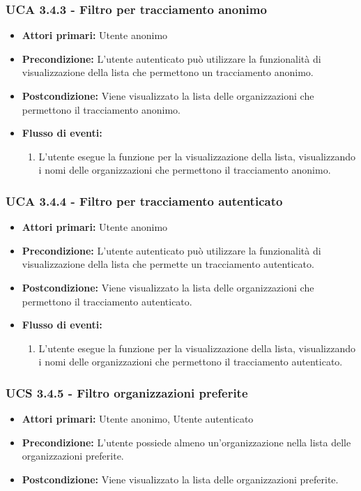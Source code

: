 \subsubsection{UCA 3.4.3 - Filtro per tracciamento anonimo}%
\begin{itemize}
	\item \textbf{Attori primari:} Utente anonimo
	\item \textbf{Precondizione:} L'utente autenticato può utilizzare la funzionalità di visualizzazione della lista che permettono un tracciamento anonimo.
	\item \textbf{Postcondizione:} Viene visualizzato la lista delle organizzazioni che permettono il tracciamento anonimo.
	\item \textbf{Flusso di eventi:}
		\begin{enumerate}
		\item L'utente esegue la funzione per la visualizzazione della lista, visualizzando i nomi delle organizzazioni che permettono il tracciamento anonimo.
	\end{enumerate}
\end{itemize}

\subsubsection{UCA 3.4.4 - Filtro per tracciamento autenticato}%
\begin{itemize}
	\item \textbf{Attori primari:} Utente anonimo
	\item \textbf{Precondizione:} L'utente autenticato può utilizzare la funzionalità di visualizzazione della lista che permette un tracciamento autenticato.
	\item \textbf{Postcondizione:} Viene visualizzato la lista delle organizzazioni che permettono il tracciamento autenticato.
	\item \textbf{Flusso di eventi:}
	\begin{enumerate}
		\item L'utente esegue la funzione per la visualizzazione della lista, visualizzando i nomi delle organizzazioni che permettono il tracciamento autenticato.
	\end{enumerate}
\end{itemize}

\subsubsection{UCS 3.4.5 - Filtro organizzazioni preferite}%
\begin{itemize}
	\item \textbf{Attori primari:} Utente anonimo, Utente autenticato
	\item \textbf{Precondizione:} L'utente possiede almeno un'organizzazione nella lista delle organizzazioni preferite.
	\item \textbf{Postcondizione:} Viene visualizzato la lista delle organizzazioni preferite.
\end{itemize}

